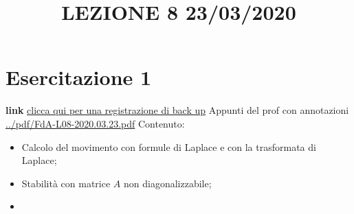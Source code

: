 \section{Esercitazione 1}
\title{LEZIONE 8 23/03/2020}\newline
\textbf{link} \href{https://onedrive.live.com/?authkey=%21AATVJK3srNwxGzs&id=EE092FF4FF7B5B0E%212158&cid=EE092FF4FF7B5B0E}{clicca qui per una registrazione di back up}\newline
\newline
Appunti del prof con annotazioni \url{../pdf/FdA-L08-2020.03.23.pdf}\newline
Contenuto:
\begin{itemize}
    \item Calcolo del movimento con formule di Laplace e con la trasformata di Laplace;
    \item Stabilità con matrice $A$ non diagonalizzabile;
    \item 
\end{itemize}